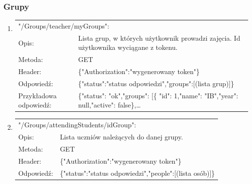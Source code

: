 \documentclass[12pt, titlepage]{article}
\begin{document}
\subsubsection{Grupy}

\begin{enumerate}
	\item 
	{\renewcommand{\arraystretch}{1.5}
	\begin{tabular}[t]{p{3cm} p{15cm}}
	\multicolumn{2}{l}{"/Groups/teacher/myGroups":} \\
	Opis: &  Lista grup, w których użytkownik prowadzi zajęcia. \newline Id użytkownika wyciągane z tokenu. \\
	Metoda: & GET \\
	Header: & \{"Authorization":"wygenerowany token"\} \\
	Odpowiedź: & \{"status":"status odpowiedzi",\newline "groups":[(lista grup)]\} \\
	Przykładowa \newline odpowiedź: & 			\{"status": "ok",\newline "groups": [\newline \{ "id": 1,\newline "name": "IB",\newline "year": null,\newline "active": false\},\newline \ldots
	\end{tabular}}
	
	\item 
	{\renewcommand{\arraystretch}{1.5}
	\begin{tabular}[t]{p{3cm} p{15cm}}
	\multicolumn{2}{l}{"/Groups/attendingStudents/{idGroup}":} \\
	Opis: &  Lista uczniów należących do danej grupy. \\
	Metoda: & GET \\
	Header: & \{"Authorization":"wygenerowany token"\} \\
	Odpowiedź: & \{"status":"status odpowiedzi",\newline "people":[(lista osób)]\}
	\end{tabular}}
	

\end{enumerate}
\end{document}
